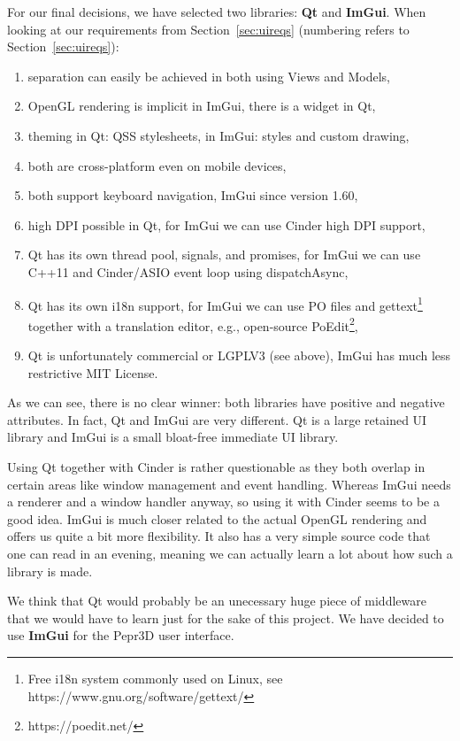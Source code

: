 For our final decisions, we have selected two libraries: \textbf{Qt} and \textbf{ImGui}.
When looking at our requirements from Section~\ref{sec:uireqs} (numbering refers to Section~\ref{sec:uireqs}):
%
\begin{enumerate}
\setlength\itemsep{0em}
\item separation can easily be achieved in both using Views and Models,
\item OpenGL rendering is implicit in ImGui, there is a widget in Qt,
\item theming in Qt: QSS stylesheets, in ImGui: styles and custom drawing,
\item both are cross-platform even on mobile devices,
\item both support keyboard navigation, ImGui since version 1.60,
\item high DPI possible in Qt, for ImGui we can use Cinder high DPI support,
\item Qt has its own thread pool, signals, and promises, for ImGui we can use C++11 and Cinder/ASIO event loop using dispatchAsync,
\item Qt has its own i18n support, for ImGui we can use PO files and gettext\footnote{Free i18n system commonly used on Linux, see https://www.gnu.org/software/gettext/} together with a translation editor, e.g., open-source PoEdit\footnote{https://poedit.net/},
\item Qt is unfortunately commercial or LGPLV3 (see above), ImGui has much less restrictive MIT License.
\end{enumerate}

As we can see, there is no clear winner: both libraries have positive and negative attributes.
In fact, Qt and ImGui are very different.
Qt is a large retained UI library and ImGui is a small bloat-free immediate UI library.

Using Qt together with Cinder is rather questionable as they both overlap in certain areas like window management and event handling.
Whereas ImGui needs a renderer and a window handler anyway, so using it with Cinder seems to be a good idea.
ImGui is much closer related to the actual OpenGL rendering and offers us quite a bit more flexibility.
It also has a very simple source code that one can read in an evening, meaning we can actually learn a lot about how such a library is made.

We think that Qt would probably be an unecessary huge piece of middleware that we would have to learn just for the sake of this project.
We have decided to use \textbf{ImGui} for the Pepr3D user interface.

